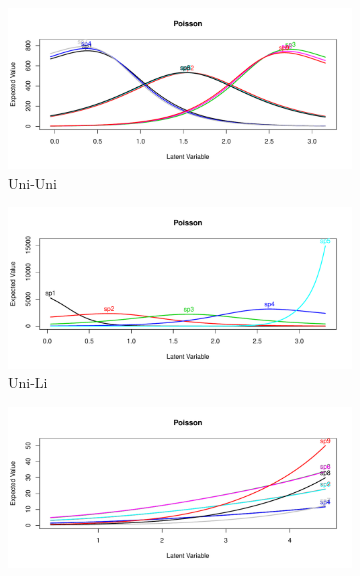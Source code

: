 		\begin{figure}[h]
			
			\begin{subfigure}{.55\textwidth}		
				\centering
				\includegraphics[width=1\linewidth]{"../02_Figures/CAO1SM1"}
				\caption{Uni-Uni}
			\end{subfigure}
			\begin{subfigure}{.55\textwidth}
				\centering		
				\includegraphics[width=1\linewidth]{"../02_Figures/CAO1SM2"}
				\caption{Uni-Li}
			\end{subfigure}
			\begin{subfigure}{.55\textwidth}	
				\centering	
				\includegraphics[width=1\linewidth]{"../02_Figures/CAO1SM3"}

\end{subfigure}
\end{figure}
